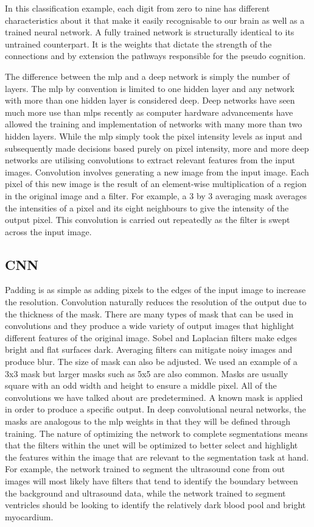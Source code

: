\documentclass[12pt]{article}
\begin{document}
In this classification example, each digit from zero to nine has different characteristics about it that make it easily recognisable to our brain as well as a trained neural network.
A fully trained network is structurally identical to its untrained counterpart. It is the weights that dictate the strength of the connections and by extension the pathways responsible for the pseudo cognition.
\par
The difference between the mlp and a deep network is simply the number of layers.
The mlp by convention is limited to one hidden layer and any network with more than one hidden layer is considered deep.
Deep networks have seen much more use than mlps recently as computer hardware advancements have allowed the training and implementation of networks with many more than two hidden layers.
While the mlp simply took the pixel intensity levels as input and subsequently made decisions based purely on pixel intensity, more and more deep networks are utilising convolutions to extract relevant features from the input images.
Convolution involves generating a new image from the input image. Each pixel of this new image is the result of an element-wise multiplication of a region in the original image and a filter.
For example, a 3 by 3 averaging mask averages the intensities of a pixel and its eight neighbours to give the intensity of the output pixel.
This convolution is carried out repeatedly as the filter is swept across the input image.

\subsection{CNN}
\par
Padding is as simple as adding pixels to the edges of the input image to increase the resolution.
Convolution naturally reduces the resolution of the output due to the thickness of the mask.
There are many types of mask that can be used in convolutions and they produce a wide variety of output images that highlight different features of the original image.
Sobel and Laplacian filters make edges bright and flat surfaces dark. Averaging filters can mitigate noisy images and produce blur.
The size of mask can also be adjusted. We used an example of a 3x3 mask but larger masks such as 5x5 are also common.
Masks are usually square with an odd width and height to ensure a middle pixel. All of the convolutions we have talked about are predetermined.
A known mask is applied in order to produce a specific output. In deep convolutional neural networks, the masks are analogous to the mlp weights in that they will be defined through training.
The nature of optimizing the network to complete segmentations means that the filters within the unet will be optimized to better select and highlight the features within the image that are relevant to the segmentation task at hand.
For example, the network trained to segment the ultrasound cone from out images will most likely have filters that tend to identify the boundary between the background and ultrasound data,
while the network trained to segment ventricles should be looking to identify the relatively dark blood pool and bright myocardium.
\end{document}

